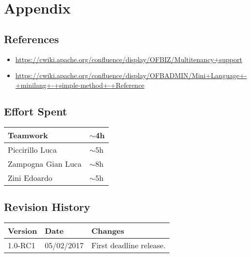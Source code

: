\section{Appendix}

\subsection{References}
\begin{itemize}
    \item \url{https://cwiki.apache.org/confluence/display/OFBIZ/Multitenancy+support}
    \item \url{https://cwiki.apache.org/confluence/display/OFBADMIN/Mini+Language+-+minilang+-+simple-method+-+Reference}
\end{itemize}

\subsection{Effort Spent}
\begin{tabular}{| p{5cm} | p{5cm} |}
\hline
Teamwork & $\sim$4h\\
\hline
Piccirillo Luca & $\sim$5h\\
\hline
Zampogna Gian Luca & $\sim$8h\\
\hline
Zini Edoardo & $\sim$5h\\
\hline
\end{tabular}


\subsection{Revision History}
\begin{tabular}{| l | l | p{10cm} |}
\hline
\textbf{Version} & \textbf{Date} & \textbf{Changes}\\
\hline
1.0-RC1 & 05/02/2017 & First deadline release.\\
\hline
\end{tabular}
